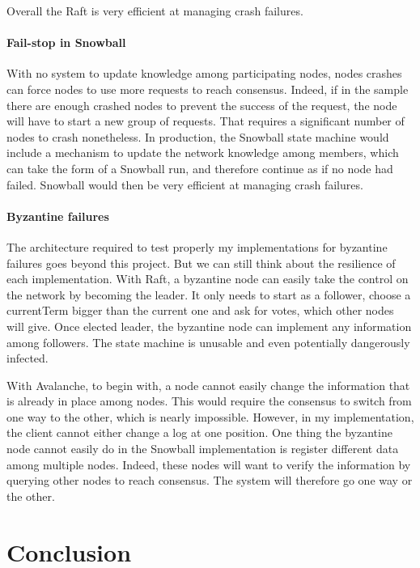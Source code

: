 \documentclass[11pt, twocolumn]{article}
\begin{document}
Overall the Raft is very efficient at managing crash failures.

\paragraph{Fail-stop in Snowball}
With no system to update knowledge among participating nodes, nodes crashes can force nodes to use more requests to reach consensus.
Indeed, if in the sample there are enough crashed nodes to prevent the success of the request, the node will have to start a new group of requests. That requires a significant number of nodes to crash nonetheless.
In production, the Snowball state machine would include a mechanism to update the network knowledge among members, which can take the form of a Snowball run, and therefore continue as if no node had failed.
Snowball would then be very efficient at managing crash failures.

\paragraph{Byzantine failures}
The architecture required to test properly my implementations for byzantine failures goes beyond this project. But we can still think about the resilience of each implementation.
With Raft, a byzantine node can easily take the control on the network by becoming the leader. It only needs to start as a follower, choose a currentTerm bigger than the current one and ask for votes, which other nodes will give.
Once elected leader, the byzantine node can implement any information among followers. The state machine is unusable and even potentially dangerously infected.

With Avalanche, to begin with, a node cannot easily change the information that is already in place among nodes. This would require the consensus to switch from one way to the other, which is nearly impossible. However, in my implementation, the client cannot either change a log at one position.
One thing the byzantine node cannot easily do in the Snowball implementation is register different data among multiple nodes. Indeed, these nodes will want to verify the information by querying other nodes to reach consensus. The system will therefore go one way or the other.

\section{Conclusion}
\end{document}
